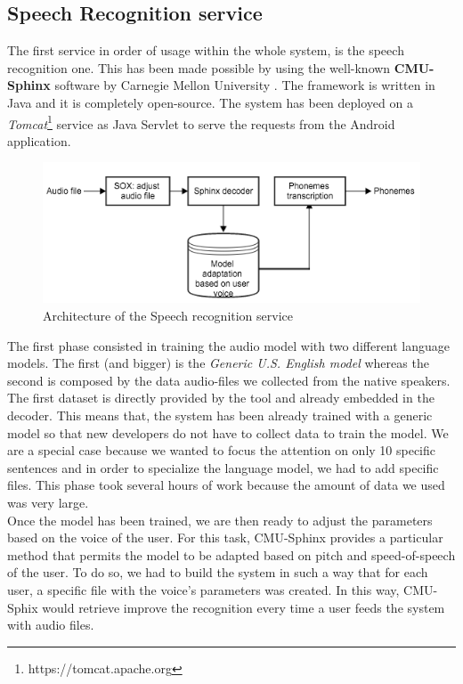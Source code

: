 \subsection{Speech Recognition service} 
\label{ssec:training_sr_model}

The first service in order of usage within the whole system, is the speech recognition one. This has been made possible by using the well-known \textbf{CMU-Sphinx} software by Carnegie Mellon University \cite{walker2004sphinx}. The framework is written in Java and it is completely open-source. The system has been deployed on a \textit{Tomcat}\footnote{https://tomcat.apache.org} service as Java Servlet to serve the requests from the Android application. \\

\begin{figure}[!ht]
	\centering
	\includegraphics[scale=0.6]{Figures/sphinx_service.png}
	\caption{Architecture of the Speech recognition service}
	\label{fig:sphinx_service}
\end{figure}

\noindent The first phase consisted in training the audio model with two different language models. The first (and bigger) is the \textit{Generic U.S. English model} whereas the second is composed by the data audio-files we collected from the native speakers. The first dataset is directly provided by the tool and already embedded in the decoder. This means that, the system has been already trained with a generic model so that new developers do not have to collect data to train the model. We are a special case because we wanted to focus the attention on only 10 specific sentences and in order to specialize the language model, we had to add specific files. This phase took several hours of work because the amount of data we used was very large. \\

\noindent Once the model has been trained, we are then ready to adjust the parameters based on the voice of the user. For this task, CMU-Sphinx provides a particular method that permits the model to be adapted based on pitch and speed-of-speech of the user. To do so, we had to build the system in such a way that for each user, a specific file with the voice's parameters was created. In this way, CMU-Sphix would retrieve improve the recognition every time a user feeds the system with audio files. \\

